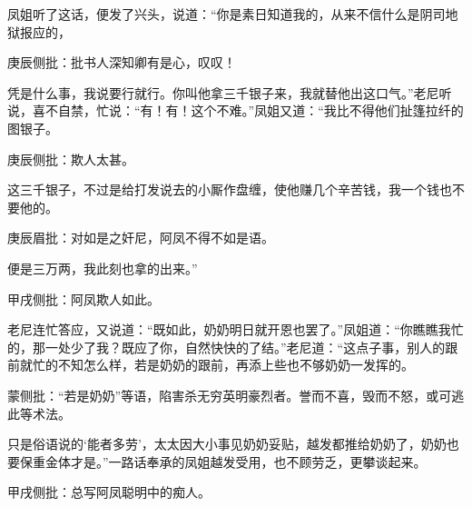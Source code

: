 \begin{parag}

    凤姐听了这话，便发了兴头，说道：“你是素日知道我的，从来不信什么是阴司地狱报应的，\begin{note}庚辰侧批：批书人深知卿有是心，叹叹！\end{note}凭是什么事，我说要行就行。你叫他拿三千银子来，我就替他出这口气。”老尼听说，喜不自禁，忙说：“有！有！这个不难。”凤姐又道：“我比不得他们扯篷拉纤的图银子。\begin{note}庚辰侧批：欺人太甚。\end{note}这三千银子，不过是给打发说去的小厮作盘缠，使他赚几个辛苦钱，我一个钱也不要他的。\begin{note}庚辰眉批：对如是之奸尼，阿凤不得不如是语。\end{note}便是三万两，我此刻也拿的出来。”\begin{note}甲戌侧批：阿凤欺人如此。\end{note}老尼连忙答应，又说道：“既如此，奶奶明日就开恩也罢了。”凤姐道：“你瞧瞧我忙的，那一处少了我？既应了你，自然快快的了结。”老尼道：“这点子事，别人的跟前就忙的不知怎么样，若是奶奶的跟前，再添上些也不够奶奶一发挥的。\begin{note}蒙侧批：“若是奶奶”等语，陷害杀无穷英明豪烈者。誉而不喜，毁而不怒，或可逃此等术法。\end{note}只是俗语说的‘能者多劳’，太太因大小事见奶奶妥贴，越发都推给奶奶了，奶奶也要保重金体才是。”一路话奉承的凤姐越发受用，也不顾劳乏，更攀谈起来。\begin{note}甲戌侧批：总写阿凤聪明中的痴人。\end{note}
\end{parag}


